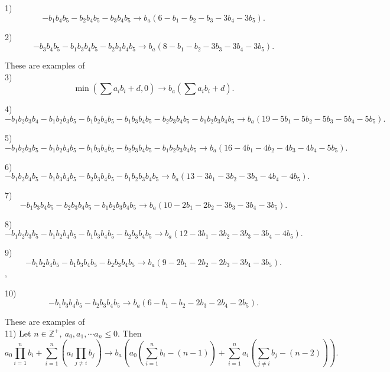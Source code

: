 \documentclass[11pt]{scrartcl}
\begin{document}
\author{} 
\date{SEP 2019}

1)\[-b_1 b_4 b_5 - b_2 b_4 b_5 -b_3 b_4 b_5 \longrightarrow  b_a(6 -b_1 -b_2 -b_3 -3b_4 -3b_5). \]

2)\[-b_3 b_4 b_5 - b_1 b_3 b_4 b_5 - b_2 b_3 b_4 b_5 \longrightarrow b_a(8-b_1 - b_2 - 3b_3 -3b_4 -3b_5). \]

These are examples of \\
3) \[\min \left ( \sum a_i b_i + d, 0\right) \longrightarrow b_a\left(\sum a_i b_i + d \right). \] 

4)\[ -b_1 b_2 b_3 b_4-b_1b_2b_3b_5-b_1b_2b_4b_5-b_1b_3b_4b_5-b_2b_3b_4b_5-b_1b_2b_3b_4b_5
\longrightarrow b_a(19-5b_1 -5b_2 -5b_3 -5b_4 -5b_5).\]

5)\[-b_1b_2b_3b_5-b_1b_2b_4b_5-b_1b_3b_4b_5-b_2b_3b_4b_5-b_1b_2b_3b_4b_5
\longrightarrow b_a(16-4b_1 -4b_2 -4b_3 -4b_4 -5b_5).\]

6)
\[-b_1b_2b_4b_5-b_1b_3b_4b_5-b_2b_3b_4b_5-b_1b_2b_3b_4b_5
\longrightarrow b_a(13 -3b_1-3b_2-3b_3-4b_4-4b_5).\]

7)
\[-b_1b_3b_4b_5-b_2b_3b_4b_5-b_1b_2b_3b_4b_5
\longrightarrow b_a(10-2b_1-2b_2-3b_3-3b_4-3b_5).\]

8)
\[-b_1b_2b_3b_5-b_1b_2b_4b_5-b_1b_3b_4b_5-b_2b_3b_4b_5
\longrightarrow b_a(12-3b_1-3b_2-3b_3-3b_4-4b_5).\]

9)
\[-b_1b_2b_4b_5-b_1b_3b_4b_5-b_2b_3b_4b_5
\longrightarrow b_a(9-2b_1-2b_2-2b_3-3b_4-3b_5).\],

10)
\[-b_1b_3b_4b_5-b_2b_3b_4b_5
\longrightarrow b_a(6-b_1-b_2-2b_3-2b_4-2b_5).\]

These are examples of \\
11) Let $n \in \mathbb{Z}^+,\ a_0, a_1, \cdots a_n \le 0$. Then \[ a_0 \prod_{i = 1}^n b_i + \sum_{i = 1}^n \left( a_i \prod_{j \neq i} b_j\right) \longrightarrow  b_a \left(a_0\left(\sum_{i=1}^n b_i - (n-1)\right) + \sum_{i=1}^n a_i \left( \sum_{j \neq i} b_j - (n-2)\right) \right). \]
\end{document}
